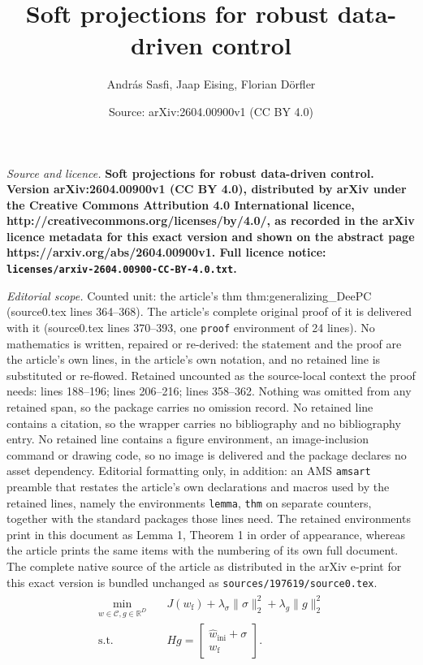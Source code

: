 \documentclass[10pt,a4paper]{amsart}
\title{\LARGE \bf Soft projections for robust data-driven control}
\author{Andr\'as Sasfi, Jaap Eising, Florian D\"orfler}
\date{Source: arXiv:2604.00900v1 (CC BY 4.0)}
\begin{document}
\maketitle

\noindent\emph{Source and licence.} \LARGE \bf Soft projections for robust data-driven control. Version arXiv:2604.00900v1 (CC BY 4.0), distributed by arXiv under the Creative Commons Attribution 4.0 International licence, http://creativecommons.org/licenses/by/4.0/, as recorded in the arXiv licence metadata for this exact version and shown on the abstract page https://arxiv.org/abs/2604.00900v1. Full licence notice: \texttt{licenses/arxiv-2604.00900-CC-BY-4.0.txt}.\par\smallskip

\noindent\textit{Editorial scope.} Counted unit: the article's thm thm:generalizing\_DeePC (source0.tex lines 364--368). The article's complete original proof of it is delivered with it (source0.tex lines 370--393, one \texttt{proof} environment of 24 lines). No mathematics is written, repaired or re-derived: the statement and the proof are the article's own lines, in the article's own notation, and no retained line is substituted or re-flowed.  Retained uncounted as the source-local context the proof needs: lines 188--196; lines 206--216; lines 358--362.  Nothing was omitted from any retained span, so the package carries no omission record.  No retained line contains a citation, so the wrapper carries no bibliography and no bibliography entry.  No retained line contains a figure environment, an image-inclusion command or drawing code, so no image is delivered and the package declares no asset dependency.  Editorial formatting only, in addition: an AMS \texttt{amsart} preamble that restates the article's own declarations and macros used by the retained lines, namely the environments \texttt{lemma}, \texttt{thm} on separate counters, together with the standard packages those lines need.  The retained environments print in this document as Lemma 1, Theorem 1 in order of appearance, whereas the article prints the same items with the numbering of its own full document.  The complete native source of the article as distributed in the arXiv e-print for this exact version is bundled unchanged as \texttt{sources/197619/source0.tex}.
\begin{align} \label{eq:DeePC}
    \begin{split}
    \min_{w \in \mathcal{C},g\in\mathbb{R}^D} & \quad J(w_\mathrm{f}) + \lambda_\sigma \|\sigma\|_2^2 + \lambda_g\|g\|_2^2 \\
    \mathrm{s.t.} & \quad Hg = \begin{bmatrix}
        \hat{w}_\mathrm{ini} + \sigma \\ 
        w_\mathrm{f}
    \end{bmatrix}.
    \end{split}
\end{align}
\end{document}
